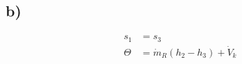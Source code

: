 

\subsection*{b)}

\begin{align*}
s_1 &= s_3 \\
\Theta &= \dot{m}_R (h_2 - h_3) + \dot{V}_k
\end{align*}